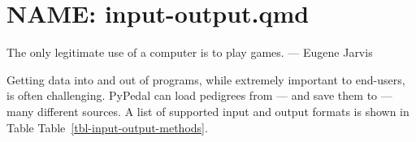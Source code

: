 \documentclass[
  letterpaper,
  DIV=11,
  numbers=noendperiod]{scrreprt}
\begin{document}

\chapter{NAME: input-output.qmd}\label{name-input-output.qmd}

\begin{tcolorbox}[enhanced jigsaw, colframe=quarto-callout-tip-color-frame, bottomrule=.15mm, toprule=.15mm, colback=white, left=2mm, breakable, rightrule=.15mm, leftrule=.75mm, opacityback=0, arc=.35mm]

The only legitimate use of a computer is to play games. --- Eugene
Jarvis

\end{tcolorbox}

Getting data into and out of programs, while extremely important to
end-users, is often challenging. PyPedal can load pedigrees from --- and
save them to --- many different sources. A list of supported input and
output formats is shown in Table Table~\ref{tbl-input-output-methods}.
\end{document}
